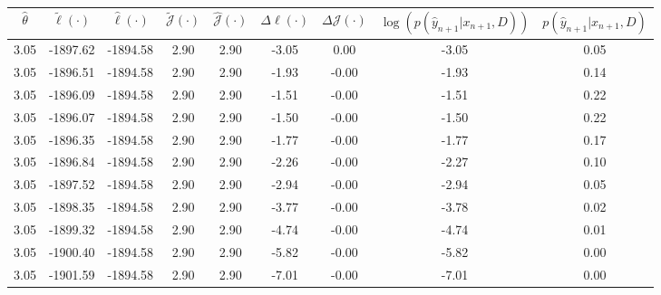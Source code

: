 \begin{table}[htbp]
        \centering
        \tiny
        \begin{adjustbox}{angle=90}
            \begin{tabular}{|c|c|c|c|c|c|c|c|c|}
                \hline
                 $\hat{\theta}$ & $\tilde{\ell}(\cdot)$ & $\hat{\ell}(\cdot)$ & $\tilde{\mathcal{J}}(\cdot)$ & $\hat{\mathcal{J}}(\cdot)$ & $\Delta \ell(\cdot)$ & $\Delta \mathcal{J}(\cdot)$ & $\log(p(\hat{y}_{n+1}|x_{n+1}, D))$ & $p(\hat{y}_{n+1}|x_{n+1}, D)$ \\
                \hline
                 3.05 & -1897.62 & -1894.58 & 2.90 & 2.90 & -3.05 & 0.00 & -3.05 & 0.05\\ \hline
 3.05 & -1896.51 & -1894.58 & 2.90 & 2.90 & -1.93 & -0.00 & -1.93 & 0.14\\ \hline
 3.05 & -1896.09 & -1894.58 & 2.90 & 2.90 & -1.51 & -0.00 & -1.51 & 0.22\\ \hline
 3.05 & -1896.07 & -1894.58 & 2.90 & 2.90 & -1.50 & -0.00 & -1.50 & 0.22\\ \hline
 3.05 & -1896.35 & -1894.58 & 2.90 & 2.90 & -1.77 & -0.00 & -1.77 & 0.17\\ \hline
 3.05 & -1896.84 & -1894.58 & 2.90 & 2.90 & -2.26 & -0.00 & -2.27 & 0.10\\ \hline
 3.05 & -1897.52 & -1894.58 & 2.90 & 2.90 & -2.94 & -0.00 & -2.94 & 0.05\\ \hline
 3.05 & -1898.35 & -1894.58 & 2.90 & 2.90 & -3.77 & -0.00 & -3.78 & 0.02\\ \hline
 3.05 & -1899.32 & -1894.58 & 2.90 & 2.90 & -4.74 & -0.00 & -4.74 & 0.01\\ \hline
 3.05 & -1900.40 & -1894.58 & 2.90 & 2.90 & -5.82 & -0.00 & -5.82 & 0.00\\ \hline
 3.05 & -1901.59 & -1894.58 & 2.90 & 2.90 & -7.01 & -0.00 & -7.01 & 0.00\\ \hline
            \end{tabular}
        \end{adjustbox}
        \caption{}
        \label{}
    \end{table}
    